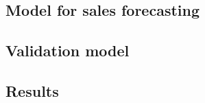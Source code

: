     \subsection{Model for sales forecasting} \label{subsec:calculate_models}
    \subsection{Validation model} \label{subsec:validatibg_models}
    \subsection{Results} \label{subsec:experimentResults}
